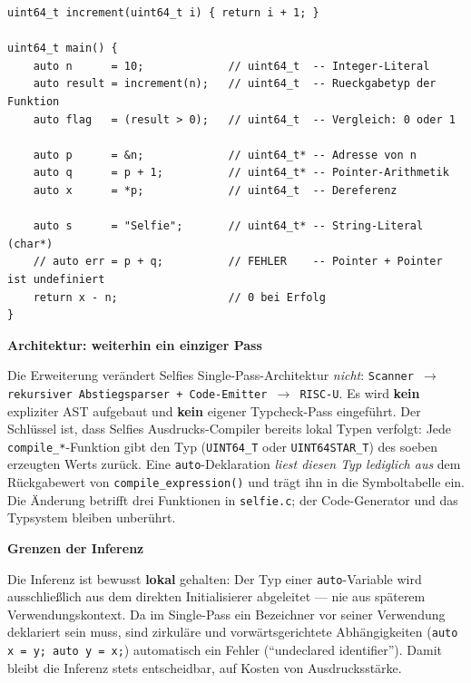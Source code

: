 \documentclass[a4paper,10pt]{article}
\begin{document}
\begin{lstlisting}
uint64_t increment(uint64_t i) { return i + 1; }

uint64_t main() {
    auto n      = 10;             // uint64_t  -- Integer-Literal
    auto result = increment(n);   // uint64_t  -- Rueckgabetyp der Funktion
    auto flag   = (result > 0);   // uint64_t  -- Vergleich: 0 oder 1

    auto p      = &n;             // uint64_t* -- Adresse von n
    auto q      = p + 1;          // uint64_t* -- Pointer-Arithmetik
    auto x      = *p;             // uint64_t  -- Dereferenz

    auto s      = "Selfie";       // uint64_t* -- String-Literal (char*)
    // auto err = p + q;          // FEHLER    -- Pointer + Pointer ist undefiniert
    return x - n;                 // 0 bei Erfolg
}
\end{lstlisting}

\textbf{Architektur: weiterhin ein einziger Pass}

Die Erweiterung verändert Selfies Single-Pass-Architektur \emph{nicht}: \texttt{Scanner $\rightarrow$ rekursiver Abstiegsparser \texttt{+} Code-Emitter $\rightarrow$ RISC-U}. Es wird \textbf{kein} expliziter AST aufgebaut und \textbf{kein} eigener Typcheck-Pass eingeführt. Der Schlüssel ist, dass Selfies Ausdrucks-Compiler bereits lokal Typen verfolgt: Jede \texttt{compile\_*}-Funktion gibt den Typ (\texttt{UINT64\_T} oder \texttt{UINT64STAR\_T}) des soeben erzeugten Werts zurück. Eine \texttt{auto}-Deklaration \emph{liest diesen Typ lediglich aus} dem Rückgabewert von \texttt{compile\_expression()} und trägt ihn in die Symboltabelle ein. Die Änderung betrifft drei Funktionen in \texttt{selfie.c}; der Code-Generator und das Typsystem bleiben unberührt.

\textbf{Grenzen der Inferenz}

Die Inferenz ist bewusst \textbf{lokal} gehalten: Der Typ einer \texttt{auto}-Variable wird ausschließlich aus dem direkten Initialisierer abgeleitet --- nie aus späterem Verwendungskontext. Da im Single-Pass ein Bezeichner vor seiner Verwendung deklariert sein muss, sind zirkuläre und vorwärtsgerichtete Abhängigkeiten (\texttt{auto x = y; auto y = x;}) automatisch ein Fehler (``undeclared identifier''). Damit bleibt die Inferenz stets entscheidbar, auf Kosten von Ausdrucksstärke.
\end{document}
